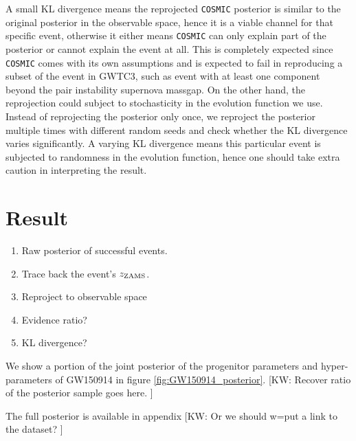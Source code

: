 \documentclass[twocolumn]{aastex631}
\newcommand{\kw}[1]{{\color{rb4}[KW: #1 ]}}
\begin{document}
A small KL divergence means the reprojected \texttt{COSMIC} posterior is similar to the original posterior in the observable space, hence it is a viable channel for that specific event, otherwise it either means \texttt{COSMIC} can only explain part of the posterior or cannot explain the event at all.
This is completely expected since \texttt{COSMIC} comes with its own assumptions and is expected to fail in reproducing a subset of the event in GWTC3, such as event with at least one component beyond the pair instability supernova massgap.
On the other hand, the reprojection could subject to stochasticity in the evolution function we use.
Instead of reprojecting the posterior only once, we reproject the posterior multiple times with different random seeds and check whether the KL divergence varies significantly.
A varying KL divergence means this particular event is subjected to randomness in the evolution function, hence one should take extra caution in interpreting the result.


\section{Result}
\label{sec:result}

\begin{enumerate}
\item Raw posterior of successful events.
\item Trace back the event's $z_{\rm ZAMS}$.
\item Reproject to observable space
\item Evidence ratio?
\item KL divergence?
\end{enumerate}


We show a portion of the joint posterior of the progenitor parameters and hyper-parameters of GW150914 in figure \ref{fig:GW150914_posterior}.
\kw{Recover ratio of the posterior sample goes here.}

The full posterior is available in appendix \kw{Or we should w=put a link to the dataset?}
\end{document}
